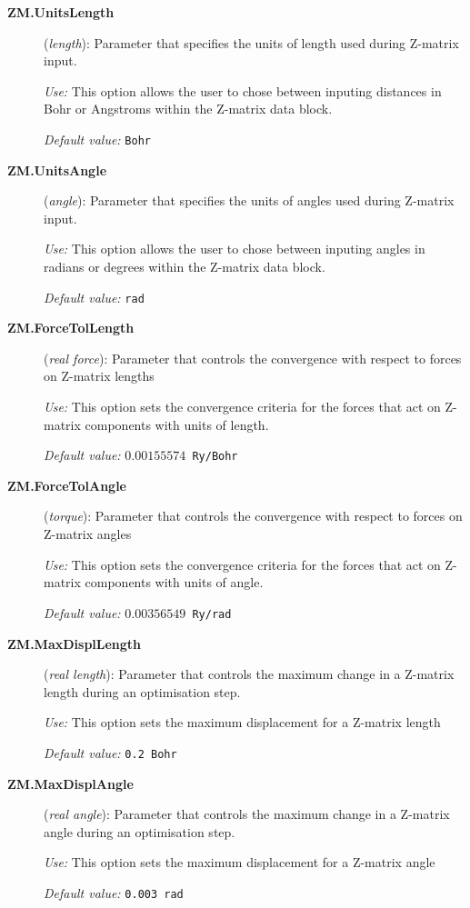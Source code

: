 \documentclass[11pt]{article}
\begin{document}
\begin{description}
\item[{\bf ZM.UnitsLength}] ({\it length}):
Parameter that specifies the units of length used during Z-matrix input.

{\it Use:} This option allows the user to chose between inputing distances
in Bohr or Angstroms within the Z-matrix data block.

{\it Default value:} {\tt Bohr}

\item[{\bf ZM.UnitsAngle}] ({\it angle}):
Parameter that specifies the units of angles used during Z-matrix input.

{\it Use:} This option allows the user to chose between inputing angles
in radians or degrees within the Z-matrix data block.

{\it Default value:} {\tt rad}

\item[{\bf ZM.ForceTolLength}] ({\it real force}):
Parameter that controls the convergence with respect to forces on Z-matrix lengths

{\it Use:} This option sets the convergence criteria for the forces that
act on Z-matrix components with units of length.

{\it Default value:} {\tt $0.00155574$ Ry/Bohr}

\item[{\bf ZM.ForceTolAngle}] ({\it torque}):
Parameter that controls the convergence with respect to forces on Z-matrix angles

{\it Use:} This option sets the convergence criteria for the forces that
act on Z-matrix components with units of angle.

{\it Default value:} {\tt $0.00356549$ Ry/rad}

\item[{\bf ZM.MaxDisplLength}] ({\it real length}):
Parameter that controls the maximum change in a Z-matrix length during an 
optimisation step.

{\it Use:} This option sets the maximum displacement for a Z-matrix length

{\it Default value:} {\tt 0.2 Bohr}

\item[{\bf ZM.MaxDisplAngle}] ({\it real angle}):
Parameter that controls the maximum change in a Z-matrix angle during an 
optimisation step.

{\it Use:} This option sets the maximum displacement for a Z-matrix angle

{\it Default value:} {\tt 0.003 rad }

\end{description}
\end{document}
